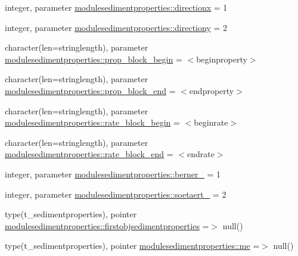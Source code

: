 \begin{DoxyCompactItemize}
\item 
integer, parameter \mbox{\hyperlink{namespacemodulesedimentproperties_a5247c2651bb8337f376c5dd0f2361aaf}{modulesedimentproperties\+::directionx}} = 1
\item 
integer, parameter \mbox{\hyperlink{namespacemodulesedimentproperties_a9a8b1a17570f1df269060a1654bdf5ef}{modulesedimentproperties\+::directiony}} = 2
\item 
character(len=stringlength), parameter \mbox{\hyperlink{namespacemodulesedimentproperties_a73a755739b1824b540e415040e452dd1}{modulesedimentproperties\+::prop\+\_\+block\+\_\+begin}} = \textquotesingle{}$<$beginproperty$>$\textquotesingle{}
\item 
character(len=stringlength), parameter \mbox{\hyperlink{namespacemodulesedimentproperties_a09d22580c2dcefeb433a3f90db04162f}{modulesedimentproperties\+::prop\+\_\+block\+\_\+end}} = \textquotesingle{}$<$endproperty$>$\textquotesingle{}
\item 
character(len=stringlength), parameter \mbox{\hyperlink{namespacemodulesedimentproperties_a21424bbfa6662992068ecdf9dd2e03f4}{modulesedimentproperties\+::rate\+\_\+block\+\_\+begin}} = \textquotesingle{}$<$beginrate$>$\textquotesingle{}
\item 
character(len=stringlength), parameter \mbox{\hyperlink{namespacemodulesedimentproperties_a2e2e7559aa8c8708cccfcdb16838b81c}{modulesedimentproperties\+::rate\+\_\+block\+\_\+end}} = \textquotesingle{}$<$endrate$>$\textquotesingle{}
\item 
integer, parameter \mbox{\hyperlink{namespacemodulesedimentproperties_a0429cf8f172c33e1391f764cb417b5f7}{modulesedimentproperties\+::berner\+\_}} = 1
\item 
integer, parameter \mbox{\hyperlink{namespacemodulesedimentproperties_ae07ece7c5ad38509d6958e1386cd9cdf}{modulesedimentproperties\+::soetaert\+\_}} = 2
\item 
type(t\+\_\+sedimentproperties), pointer \mbox{\hyperlink{namespacemodulesedimentproperties_ae4106df46f5b0fe3f153269bc770d4f2}{modulesedimentproperties\+::firstobjsedimentproperties}} =$>$ null()
\item 
type(t\+\_\+sedimentproperties), pointer \mbox{\hyperlink{namespacemodulesedimentproperties_af58fccfc55bef421fc4ec051db33d596}{modulesedimentproperties\+::me}} =$>$ null()
\end{DoxyCompactItemize}
